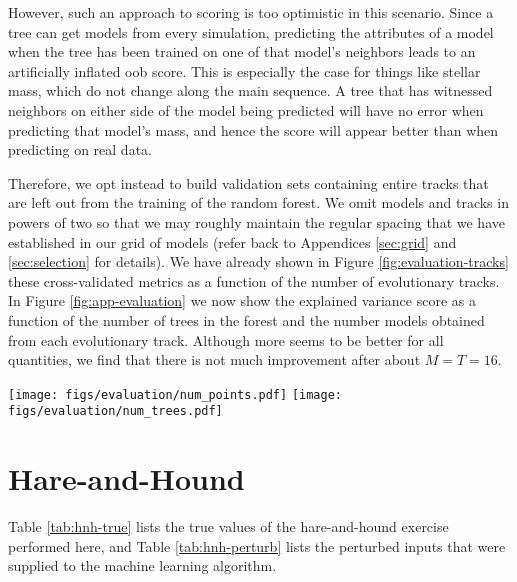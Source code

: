\documentclass[manuscript]{aastex}
\begin{document}
However, such an approach to scoring is too optimistic in this scenario. Since a tree can get models from every simulation, predicting the attributes of a model when the tree has been trained on one of that model's neighbors leads to an artificially inflated oob score. This is especially the case for things like stellar mass, which do not change along the main sequence. A tree that has witnessed neighbors on either side of the model being predicted will have no error when predicting that model's mass, and hence the score will appear better than when predicting on real data.   

Therefore, we opt instead to build validation sets containing entire tracks that are left out from the training of the random forest. We omit models and tracks in powers of two so that we may roughly maintain the regular spacing that we have established in our grid of models (refer back to Appendices \ref{sec:grid} and \ref{sec:selection} for details). We have already shown in Figure \ref{fig:evaluation-tracks} these cross-validated metrics as a function of the number of evolutionary tracks. In Figure \ref{fig:app-evaluation} we now show the explained variance score as a function of the number of trees in the forest and the number models obtained from each evolutionary track. Although more seems to be better for all quantities, we find that there is not much improvement after about $M=T=16$. 

\begin{figure*}
    \centering
    \texttt{[image: figs/evaluation/num\_points.pdf]}\hfill
    \texttt{[image: figs/evaluation/num\_trees.pdf]}
    \caption{Explained variance of each stellar parameter as a function of the number of models per evolutionary track (left) and the number of trees used in training the random forest (right). \textbf{todo: remove mass_cc} } 
    \label{fig:app-evaluation}
\end{figure*}


\section{Hare-and-Hound}
\label{sec:hare-and-hound}
Table \ref{tab:hnh-true} lists the true values of the hare-and-hound exercise performed here, and Table \ref{tab:hnh-perturb} lists the perturbed inputs that were supplied to the machine learning algorithm. 
\end{document}
